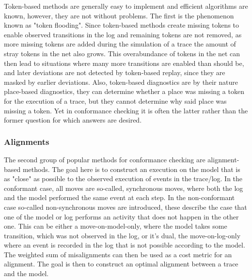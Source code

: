 \documentclass[runningheads]{template/llncs}
\begin{document}
Token-based methods are generally easy to implement and efficient algorithms are known, however, they are not without problems.
The first is the phenomenon known as "token flooding". Since token-based methods create missing tokens to enable observed transitions in the log and remaining tokens are not removed, as more missing tokens are added during the simulation of a trace the  amount of stray tokens in the net also grows.
This overabundance of tokens in the net can then lead to situations where many more transitions are enabled than should be, and later deviations are not detected by token-based replay, since they are masked by earlier deviations.
Also, token-based diagnostics are  by their nature place-based diagnostics, they can determine whether a place was missing a token for the execution of a trace, but they cannot determine why said place was missing a token. 
Yet in conformance checking it is often the latter rather than the former question for which answers are desired. 

\subsubsection{Alignments}

The second group of popular methods for conformance checking are alignment-based methods.
The goal here is to construct an execution on the model that is as "close" as possible to the observed execution of events in the trace/log.
In the conformant case, all moves are so-called, synchronous moves, where both the log and the model performed the same event at each step.
In the non-conformant case so-called non-synchronous moves are introduced, these describe the case that one of  the model or log performs an activity that does not happen in the other one.
This can be either a move-on-model-only, where the model takes some transition, which was not observed in the log, or it's dual, the move-on-log-only where an event is recorded in the log that is not possible according to the model.
The weighted sum of misalignments can then be used as a cost metric for an alignment. 
The goal is then to construct an optimal alignment between a trace and the model.
\end{document}

